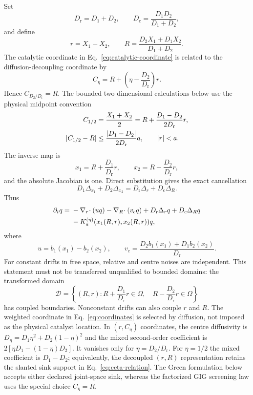 \documentclass[aps,pre,reprint,amsmath,amssymb,longbibliography,floatfix]{revtex4-2}
\newcommand{\Dr}{D_{\mathrm r}}
\newcommand{\Dc}{D_{\mathrm c}}
\begin{document}
Set
\begin{equation}
\Dr=D_1+D_2,\qquad
\Dc=\frac{D_1D_2}{D_1+D_2},
\label{eq:relative-diff}
\end{equation}
and define
\begin{equation}
r=X_1-X_2,\qquad
R=\frac{D_2X_1+D_1X_2}{D_1+D_2}.
\label{eq:coordinates}
\end{equation}
The catalytic coordinate in Eq.~\eqref{eq:catalytic-coordinate} is related to
the diffusion-decoupling coordinate by
\begin{equation}
C_\eta=R+\left(\eta-\frac{D_2}{\Dr}\right)r.
\label{eq:ceta-relation}
\end{equation}
Hence \(C_{D_2/\Dr}=R\). The bounded two-dimensional calculations below use
the physical midpoint convention
\begin{align}
C_{1/2}&=\frac{X_1+X_2}{2}
=R+\frac{D_1-D_2}{2\Dr}r,\notag\\
|C_{1/2}-R|&\leq\frac{|D_1-D_2|}{2\Dr}a,
\qquad |r|<a.
\label{eq:midpoint-shift}
\end{align}
The inverse map is
\begin{equation}
x_1=R+\frac{D_1}{\Dr}r,\qquad
x_2=R-\frac{D_2}{\Dr}r,
\label{eq:coordinate-inverse}
\end{equation}
and the absolute Jacobian is one. Direct substitution gives the exact
cancellation
\begin{equation}
D_1\Delta_{x_1}+D_2\Delta_{x_2}
=\Dr\Delta_r+\Dc\Delta_R.
\label{eq:diffusion-decoupling}
\end{equation}
Thus
\begin{align}
\partial_tq={}&-\nabla_r\!\cdot(uq)-\nabla_R\!\cdot(v_{\mathrm c}q)
 +\Dr\Delta_rq+\Dc\Delta_Rq\notag\\
&-K_a^{(\eta)}(x_1(R,r),x_2(R,r))q,
\label{eq:transformed-fp}
\end{align}
where
\begin{equation}
u=b_1(x_1)-b_2(x_2),\qquad
v_{\mathrm c}=\frac{D_2b_1(x_1)+D_1b_2(x_2)}{\Dr}.
\label{eq:transformed-drifts}
\end{equation}
For constant drifts in free space, relative and centre noises are independent.
This statement must not be transferred unqualified to bounded domains: the
transformed domain
\begin{equation}
\mathcal D=\left\{(R,r):
R+\frac{D_1}{\Dr}r\in\Omega,\quad
R-\frac{D_2}{\Dr}r\in\Omega\right\}
\label{eq:transformed-domain}
\end{equation}
has coupled boundaries. Nonconstant drifts can also couple \(r\) and \(R\).
The weighted coordinate in Eq.~\eqref{eq:coordinates} is selected by diffusion,
not imposed as the physical catalyst location. In \((r,C_\eta)\) coordinates,
the centre diffusivity is
\(D_\eta=D_1\eta^2+D_2(1-\eta)^2\) and the mixed second-order coefficient is
\(2[\eta D_1-(1-\eta)D_2]\). It vanishes only for
\(\eta=D_2/\Dr\). For \(\eta=1/2\) the mixed coefficient is
\(D_1-D_2\); equivalently, the decoupled \((r,R)\) representation retains the
slanted sink support in Eq.~\eqref{eq:ceta-relation}. The Green formulation
below accepts either declared joint-space sink, whereas the factorized GIG
screening law uses the special choice \(C_\eta=R\).
\end{document}
